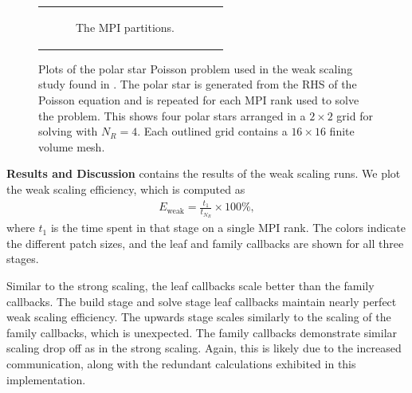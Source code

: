 \begin{figure}
\begin{tabular}{c c}
\begin{subfigure}[t]{0.45\textwidth}
            \caption{The MPI partitions.}
            \label{subfig:polar-star-partitions}
        \end{subfigure}
    \end{tabular}
    \caption{Plots of the polar star Poisson problem used in the weak scaling study found in . The polar star is generated from the RHS of the Poisson equation and is repeated for each MPI rank used to solve the problem. This shows four polar stars arranged in a $2 \times 2$ grid for solving with $N_R = 4$. Each outlined grid contains a $16 \times 16$ finite volume mesh.}
    \label{fig:polar-star-plots}
\end{figure}

{\bf Results and Discussion}
 contains the results of the weak scaling runs. We plot the weak scaling efficiency, which is computed as
\begin{align}
    E_{\text{weak}} = \frac{t_{1}}{t_{N_R}} \times 100 \%,
\end{align}
where $t_{1}$ is the time spent in that stage on a single MPI rank. The colors indicate the different patch sizes, and the leaf and family callbacks are shown for all three stages.

Similar to the strong scaling, the leaf callbacks scale better than the family callbacks. The build stage and solve stage leaf callbacks maintain nearly perfect weak scaling efficiency. The upwards stage scales similarly to the scaling of the family callbacks, which is unexpected. The family callbacks demonstrate similar scaling drop off as in the strong scaling. Again, this is likely due to the increased communication, along with the redundant calculations exhibited in this implementation.

